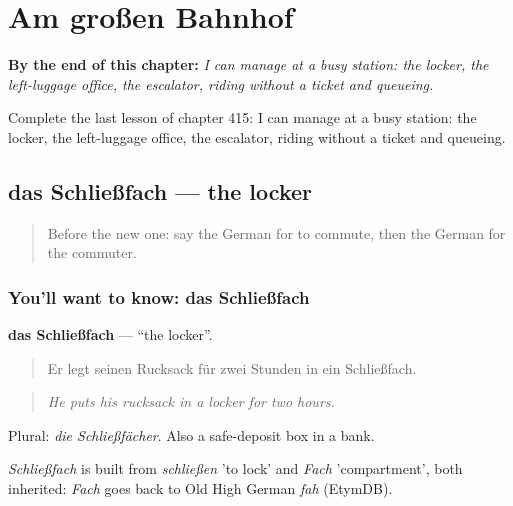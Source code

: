 
\chapter{Am großen Bahnhof}
\label{ch:ge-am-gro-en-bahnhof}

\begin{chapteropening}
\textbf{By the end of this chapter:} \emph{I can manage at a busy station: the locker, the left-luggage office, the escalator, riding without a ticket and queueing.}

Complete the last lesson of chapter 415: I can manage at a busy station: the locker, the left-luggage office, the escalator, riding without a ticket and queueing.
\end{chapteropening}

\section[das Schließfach]{das Schließfach — the locker}

\label{lesson:GE-C415-schliessfach}



\begin{quote}
Before the new one: say the German for to commute, then the German for the commuter.
\end{quote}

\subsection*{You'll want to know: das Schließfach}
\textbf{das Schließfach} — \textquotedblleft{}the locker\textquotedblright{}.

\begin{quote}
Er legt seinen Rucksack für zwei Stunden in ein Schließfach.
\end{quote}

\begin{quote}
\emph{He puts his rucksack in a locker for two hours.}
\end{quote}

Plural: \emph{die Schließfächer}. Also a safe-deposit box in a bank.

\begin{cousinweb}
\emph{Schließfach} is built from \emph{schließen} 'to lock' and \emph{Fach} 'compartment', both inherited: \emph{Fach} goes back to Old High German \emph{fah} (EtymDB).
\end{cousinweb}

